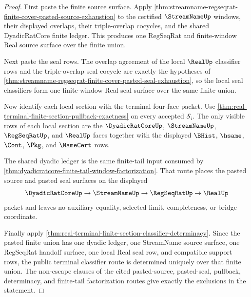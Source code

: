 \begin{proof}
First paste the finite source surface. Apply
\autoref{thm:streamname-regseqrat-finite-cover-pasted-source-exhaustion} to
the certified $\StreamNameUp$ windows, their displayed overlaps, their
triple-overlap cocycles, and the shared DyadicRatCore finite ledger. This
produces one RegSeqRat and finite-window Real source surface over the finite
union.

Next paste the seal rows. The overlap agreement of the local $\RealUp$
classifier rows and the triple-overlap seal cocycle are exactly the hypotheses
of \autoref{thm:streamname-regseqrat-finite-cover-pasted-seal-exhaustion}, so
the local seal classifiers form one finite-window Real seal surface over the
same finite union.

Now identify each local section with the terminal four-face packet. Use
\autoref{thm:real-terminal-finite-section-pullback-exactness} on every
accepted $\mathcal S_i$. The only visible rows of each local section are the
$\DyadicRatCoreUp$, $\StreamNameUp$, $\RegSeqRatUp$, and $\RealUp$ faces
together with the displayed $\BHist$, $\hsame$, $\Cont$, $\Pkg$, and
$\NameCert$ rows.

The shared dyadic ledger is the same finite-tail input consumed by
\autoref{thm:dyadicratcore-finite-tail-window-factorization}. That route
places the pasted source and pasted seal surfaces on the displayed
$$
\DyadicRatCoreUp \to \StreamNameUp \to \RegSeqRatUp \to \RealUp
$$
packet and leaves no auxiliary equality, selected-limit, completeness, or
bridge coordinate.

Finally apply
\autoref{thm:real-terminal-finite-section-classifier-determinacy}. Since the
pasted finite union has one dyadic ledger, one StreamName source surface, one
RegSeqRat handoff surface, one local Real seal row, and compatible support
rows, the public terminal classifier route is determined uniquely over that
finite union. The non-escape clauses of the cited pasted-source, pasted-seal,
pullback, determinacy, and finite-tail factorization routes give exactly the
exclusions in the statement.
\end{proof}
